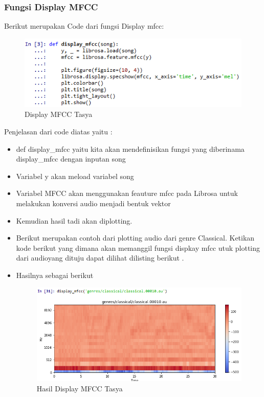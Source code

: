 \subsubsection{Fungsi Display MFCC}
Berikut merupakan Code dari fungsi Display mfcc: \\
\begin{figure}[ht]
\centering
\includegraphics[scale=0.5]{figures/chapter6tasya8.png}
\caption{Display MFCC Tasya}
\label{Praktek}
\end{figure}
Penjelasan dari code diatas yaitu :
\begin{itemize}
\item def display\_mfcc yaitu kita akan mendefinisikan fungsi yang diberinama display\_mfcc dengan inputan song
\item Variabel y akan meload variabel song
\item Variabel MFCC akan menggunakan feauture mfcc pada Librosa untuk melakukan konversi audio menjadi bentuk vektor
\item Kemudian hasil tadi akan diplotting.
\item Berikut merupakan contoh dari plotting audio dari genre Classical. Ketikan kode berikut  yang dimana akan memanggil fungsi dispkay mfcc utuk plotting dari audioyang dituju dapat dilihat dilisting berikut .

\item Hasilnya sebagai berikut 
\begin{figure}[ht]
\centering
\includegraphics[scale=0.5]{figures/chapter6tasya24.png}
\caption{Hasil Display MFCC Tasya}
\label{Praktek}
\end{figure}
\end{itemize}

